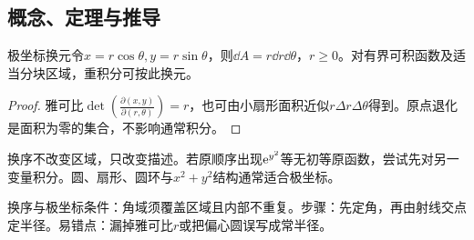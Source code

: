 \subsection{概念、定理与推导}

\begin{theorem}{极坐标换元}令$x=r\cos\theta,y=r\sin\theta$，则$\dd A=r\dd r\dd\theta$，$r\ge0$。对有界可积函数及适当分块区域，重积分可按此换元。\end{theorem}
\begin{proof}雅可比$\det\left(\frac{\partial(x,y)}{\partial(r,\theta)}\right)=r$，也可由小扇形面积近似$r\Delta r\Delta\theta$得到。原点退化是面积为零的集合，不影响通常积分。\end{proof}
换序不改变区域，只改变描述。若原顺序出现$\mathrm{e}^{y^2}$等无初等原函数，尝试先对另一变量积分。圆、扇形、圆环与$x^2+y^2$结构通常适合极坐标。

\begin{method}{换序与极坐标}条件：角域须覆盖区域且内部不重复。步骤：先定角，再由射线交点定半径。易错点：漏掉雅可比$r$或把偏心圆误写成常半径。\end{method}
